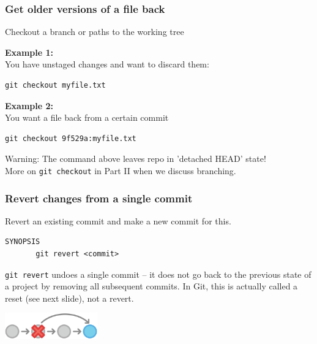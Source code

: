 \documentclass[handout,notes]{gittalk}
\newcommand{\hlcommand}[1]{ %
\colorbox{base3}{\small \texttt{#1}}
}
\begin{document}
\begin{frame}[fragile]
\frametitle{Get older versions of a file back}
\begin{tcolorbox}[title=git checkout]
Checkout a branch or paths to the working tree
\end{tcolorbox}
\vspace*{0.5em}
\textbf{Example 1:}\\
You have unstaged changes and want to discard them:\\[0.5em]
\begin{lstlisting}[basicstyle=\normalsize\ttfamily]
git checkout myfile.txt
\end{lstlisting}
\vspace*{0.5em}
\textbf{Example 2:}\\
You want a file back from a certain commit\\[0.5em]
\begin{lstlisting}[basicstyle=\normalsize\ttfamily]
git checkout 9f529a:myfile.txt
\end{lstlisting}
Warning: The command above leaves repo in 'detached HEAD' state!\\
More on \hlcommand{git checkout} in Part II when we discuss branching.
\end{frame}


\begin{frame}[fragile]
\frametitle{Revert changes from a single commit}
\begin{tcolorbox}[title=git revert]
Revert an existing commit and make a new commit for this.
\begin{lstlisting}
SYNOPSIS
       git revert <commit>
\end{lstlisting}
\end{tcolorbox}

\vspace*{1em}
\texttt{git revert} undoes a single commit -- it does not go
back to the previous state of a project by removing all subsequent 
commits.
In Git, this is actually called a reset (see next slide), not a revert.
\begin{center}
\includegraphics[width=0.3\textwidth]{./img/git-tutorial_changes-revert}
\end{center}
\end{frame}
\end{document}
